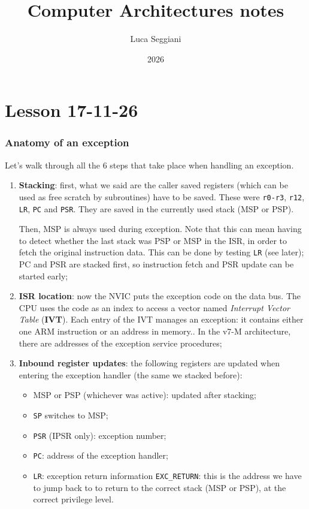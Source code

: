 \documentclass[a4paper,11pt]{article}
\title{Computer Architectures notes}
\author{Luca Seggiani}
\date{2026}
\begin{document}
\section{Lesson 17-11-26}

\thispagestyle{empty}
\pagestyle{fancy}

\subsubsection{Anatomy of an exception}

Let's walk through all the 6 steps that take place when handling an exception.

\begin{enumerate}
	\item \textbf{Stacking}: first, what we said are the caller saved registers (which can be used as free scratch by subroutines) have to be saved. These were \texttt{r0-r3}, \texttt{r12}, \texttt{LR}, \texttt{PC} and \texttt{PSR}. They are saved in the currently used stack (MSP or PSP).

	      Then, MSP is always used during exception. Note that this can mean having to detect whether the last stack was PSP or MSP in the ISR, in order to fetch the original instruction data. This can be done by testing \texttt{LR} (see later);
	      PC and PSR are stacked first, so instruction fetch and PSR update can be started early;

	\item \textbf{ISR location}: now the NVIC puts the exception code on the data bus. The CPU uses the code as an index to access a vector named \textit{Interrupt Vector Table} (\textbf{IVT}). Each entry of the IVT manages an exception: it contains either one ARM instruction or an address in memory.. In the v7-M architecture, there are addresses of the exception service procedures;

	\item \textbf{Inbound register updates}: the following registers are updated when entering the exception handler (the same we stacked before):
	      \begin{itemize}
		      \item MSP or PSP (whichever was active): updated after stacking;
		      \item \texttt{SP} switches to MSP;
		      \item \texttt{PSR} (IPSR only): exception number;
		      \item \texttt{PC}: address of the exception handler;
		      \item \texttt{LR}: exception return information \texttt{EXC\_RETURN}: this is the address we have to jump back to to return to the correct stack (MSP or PSP), at the correct privilege level.


\end{itemize}
\end{enumerate}
\end{document}
